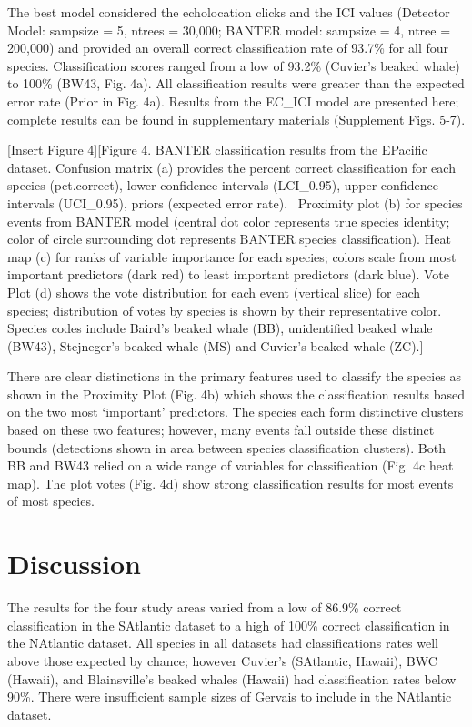 \documentclass[
  letterpaper,
  DIV=11,
  numbers=noendperiod]{scrartcl}
\begin{document}
The best model considered the echolocation clicks and the ICI values
(Detector Model: sampsize = 5, ntrees = 30,000; BANTER model: sampsize =
4, ntree = 200,000) and provided an overall correct classification rate
of 93.7\% for all four species. Classification scores ranged from a low
of 93.2\% (Cuvier's beaked whale) to 100\% (BW43, Fig. 4a). All
classification results were greater than the expected error rate (Prior
in Fig. 4a). Results from the EC\_ICI model are presented here; complete
results can be found in supplementary materials (Supplement Figs. 5-7).

{[}Insert Figure 4{]}{[}Figure 4. BANTER classification results from the
EPacific dataset. Confusion matrix (a) provides the percent correct
classification for each species (pct.correct), lower confidence
intervals (LCI\_0.95), upper confidence intervals (UCI\_0.95), priors
(expected error rate).~ Proximity plot (b) for species events from
BANTER model (central dot color represents true species identity; color
of circle surrounding dot represents BANTER species classification).
Heat map (c) for ranks of variable importance for each species; colors
scale from most important predictors (dark red) to least important
predictors (dark blue). Vote Plot (d) shows the vote distribution for
each event (vertical slice) for each species; distribution of votes by
species is shown by their representative color. Species codes include
Baird's beaked whale (BB), unidentified beaked whale (BW43), Stejneger's
beaked whale (MS) and Cuvier's beaked whale (ZC).{]}

There are clear distinctions in the primary features used to classify
the species as shown in the Proximity Plot (Fig. 4b) which shows the
classification results based on the two most `important' predictors. The
species each form distinctive clusters based on these two features;
however, many events fall outside these distinct bounds (detections
shown in area between species classification clusters). Both BB and BW43
relied on a wide range of variables for classification (Fig. 4c heat
map). The plot votes (Fig. 4d) show strong classification results for
most events of most species.

\hypertarget{discussion}{%
\section{Discussion}\label{discussion}}

The results for the four study areas varied from a low of 86.9\% correct
classification in the SAtlantic dataset to a high of 100\% correct
classification in the NAtlantic dataset. All species in all datasets had
classifications rates well above those expected by chance; however
Cuvier's (SAtlantic, Hawaii), BWC (Hawaii), and Blainsville's beaked
whales (Hawaii) had classification rates below 90\%. There were
insufficient sample sizes of Gervais to include in the NAtlantic
dataset.
\end{document}
